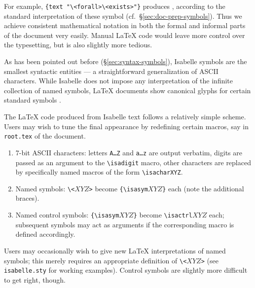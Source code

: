 \begin{isabellebody}
\begin{isamarkuptext}
  For example, \texttt{\at}\verb,{text "\<forall>\<exists>"}, produces \isa{{\isasymforall}{\isasymexists}}, according to the standard interpretation of these symbol
  (cf.\ \S\ref{sec:doc-prep-symbols}).  Thus we achieve consistent
  mathematical notation in both the formal and informal parts of the
  document very easily.  Manual {\LaTeX} code would leave more control
  over the typesetting, but is also slightly more tedious.%
\end{isamarkuptext}%
\isamarkuptrue%
%
\isamarkuptrue%
%
\begin{isamarkuptext}%
As has been pointed out before (\S\ref{sec:syntax-symbols}),
  Isabelle symbols are the smallest syntactic entities --- a
  straightforward generalization of ASCII characters.  While Isabelle
  does not impose any interpretation of the infinite collection of
  named symbols, {\LaTeX} documents show canonical glyphs for certain
  standard symbols \cite[appendix~A]{isabelle-sys}.

  The {\LaTeX} code produced from Isabelle text follows a relatively
  simple scheme.  Users may wish to tune the final appearance by
  redefining certain macros, say in \texttt{root.tex} of the document.

  \begin{enumerate}

  \item 7-bit ASCII characters: letters \texttt{A\dots Z} and
  \texttt{a\dots z} are output verbatim, digits are passed as an
  argument to the \verb,\isadigit, macro, other characters are
  replaced by specifically named macros of the form
  \verb,\isacharXYZ,.

  \item Named symbols: \verb,\,\verb,<,$XYZ$\verb,>, become
  \verb,{\isasym,$XYZ$\verb,}, each (note the additional braces).

  \item Named control symbols: \verb,{\isasym,$XYZ$\verb,}, become
  \verb,\isactrl,$XYZ$ each; subsequent symbols may act as arguments
  if the corresponding macro is defined accordingly.

  \end{enumerate}

  Users may occasionally wish to give new {\LaTeX} interpretations of
  named symbols; this merely requires an appropriate definition of
  \verb,\,\verb,<,$XYZ$\verb,>, (see \texttt{isabelle.sty} for working
  examples).  Control symbols are slightly more difficult to get
  right, though.


\end{isamarkuptext}
\end{isabellebody}
